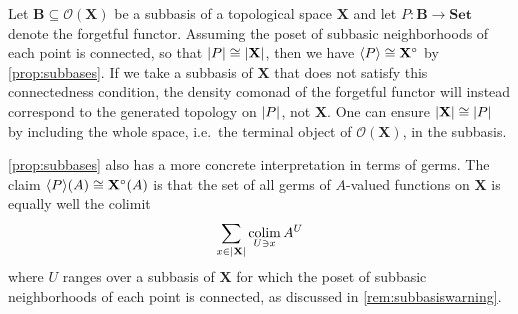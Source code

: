 \documentclass[11pt, oneside, article]{memoir}
\theoremstyle{plain}
\theoremstyle{definition}
\theoremstyle{remark}
\newenvironment{remark}
{\renewcommand\qedsymbol{$\lrcorner$}%
  \pushQED{\qed}\myremark}
{\popQED\endmyremark}
\DeclareMathOperator*{\colim}{colim}
\DeclarePairedDelimiter{\gen}{\langle}{\rangle}
\DeclarePairedDelimiter{\abs}{\lvert}{\rvert}
\newcommand{\namedcat}[1]{\mathbf{#1}}
\newcommand{\cat}[1]{\mathbf{#1}}
\newcommand{\spa}[1]{\mathbf{#1}}
\newcommand{\Set}{\namedcat{Set}}
\newcommand{\pts}[1]{{\abs{#1}}}
\newcommand{\ph}[1]{#1}
\newcommand{\xA}{A}
\newcommand{\bB}{\cat{B}}
\newcommand{\pP}{\ph{P}}
\newcommand{\cP}{\gen{\pP}}
\newcommand{\tX}{\spa{X}}
\newcommand{\cX}{\toptocmd{\tX}}
\newcommand{\toptocmd}[1]{{{#1}^\circ}}
\newcommand{\opens}[1]{\mathcal{O}(#1)}
\begin{document}
\begin{remark}\label{rem:subbasiswarning}
  Let $\bB \subseteq \opens{\tX}$ be a subbasis of a topological space
  $\tX$ and let $\pP \colon \bB \to \Set$ denote the forgetful
  functor. Assuming the poset of subbasic neighborhoods of each point
  is connected, so that $\pts{\pP} \cong \pts{\tX}$, then we have
  $\cP \cong \cX$ by \cref{prop:subbases}. If we take a subbasis of $\tX$
  that does not satisfy this connectedness condition, the density
  comonad of the forgetful functor will instead correspond to the
  generated topology on $\pts{\pP}$, not $\tX$. One can ensure
  $\pts{\tX} \cong \pts{\pP}$ by including the whole space, i.e.\ the
  terminal object of $\opens{\tX}$, in the subbasis.
\end{remark}

\begin{remark}\label{rem:subbasisgerms}
  \cref{prop:subbases} also has a more concrete interpretation in terms
  of germs. The claim $\cP(\xA)\cong\cX(\xA)$ is that the set of all
  germs of $\xA$-valued functions on $\tX$ is equally well the colimit
  \[\sum_{x\in \pts{\tX}} \colim_{U \ni x} \xA^U\]
  where $U$ ranges over a subbasis of $\tX$ for which the poset of
  subbasic neighborhoods of each point is connected, as discussed in
  \cref{rem:subbasiswarning}.


\end{remark}
\end{document}
